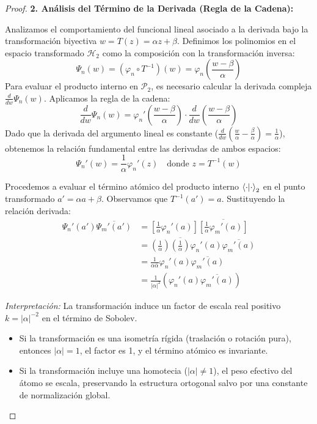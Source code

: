 \documentclass[12pt,a4paper]{article}
\begin{document}
\begin{proof}
\textbf{2. Análisis del Término de la Derivada (Regla de la Cadena):}

Analizamos el comportamiento del funcional lineal asociado a la derivada bajo la transformación biyectiva $w = T(z) = \alpha z + \beta$.
Definimos los polinomios en el espacio transformado $\mathcal{H}_2$ como la composición con la transformación inversa:
$$ \Psi_n(w) = (\varphi_n \circ T^{-1})(w) = \varphi_n\left( \frac{w-\beta}{\alpha} \right) $$
Para evaluar el producto interno en $\mathcal{P}_2$, es necesario calcular la derivada compleja $\frac{d}{dw}\Psi_n(w)$. Aplicamos la regla de la cadena:
$$ \frac{d}{dw}\Psi_n(w) = \varphi_n'\left( \frac{w-\beta}{\alpha} \right) \cdot \frac{d}{dw}\left( \frac{w-\beta}{\alpha} \right) $$
Dado que la derivada del argumento lineal es constante ($\frac{d}{dw}(\frac{w}{\alpha} - \frac{\beta}{\alpha}) = \frac{1}{\alpha}$), obtenemos la relación fundamental entre las derivadas de ambos espacios:
\begin{equation}
    \Psi_n'(w) = \frac{1}{\alpha} \varphi_n'(z) \quad \text{donde } z = T^{-1}(w)
\end{equation}

Procedemos a evaluar el término atómico del producto interno $\ip{\cdot}{\cdot}_2$ en el punto transformado $a' = \alpha a + \beta$. Observamos que $T^{-1}(a') = a$.
Sustituyendo la relación derivada:
\begin{align*}
     \Psi_n'(a') \overline{\Psi_m'(a')} &=  \left[ \frac{1}{\alpha} \varphi_n'(a) \right] \overline{\left[ \frac{1}{\alpha} \varphi_m'(a) \right]} \\
    &=  \left( \frac{1}{\alpha} \right) \overline{\left( \frac{1}{\alpha} \right)} \varphi_n'(a) \overline{\varphi_m'(a)} \\
    &= \frac{1}{\alpha \overline{\alpha}} \varphi_n'(a) \overline{\varphi_m'(a)} \\
    &= \frac{1}{|\alpha|^2} \left(  \varphi_n'(a) \overline{\varphi_m'(a)} \right)
\end{align*}

\textit{Interpretación:} La transformación induce un factor de escala real positivo $k = |\alpha|^{-2}$ en el término de Sobolev.
\begin{itemize}
    \item Si la transformación es una isometría rígida (traslación o rotación pura), entonces $|\alpha|=1$, el factor es 1, y el término atómico es invariante.
    \item Si la transformación incluye una homotecia ($|\alpha| \neq 1$), el peso efectivo del átomo se escala, preservando la estructura ortogonal salvo por una constante de normalización global.
\end{itemize}


\end{proof}
\end{document}
